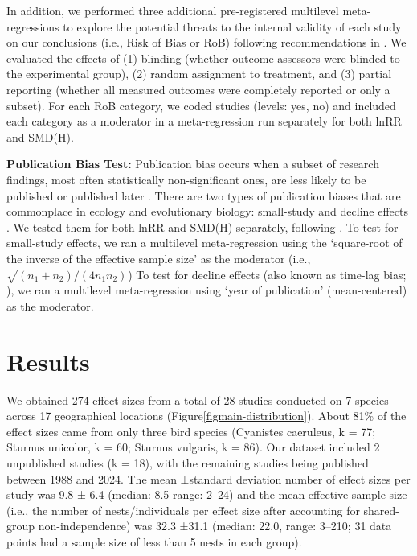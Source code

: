 \documentclass[
  number,
  review,
  onecolumn]{elsarticle}
\begin{document}
In addition, we performed three additional pre-registered multilevel
meta-regressions to explore the potential threats to the internal
validity of each study on our conclusions (i.e., Risk of Bias or RoB)
following recommendations in \citep{culina2025} . We evaluated the
effects of (1) blinding (whether outcome assessors were blinded to the
experimental group), (2) random assignment to treatment, and (3) partial
reporting (whether all measured outcomes were completely reported or
only a subset). For each RoB category, we coded studies (levels: yes,
no) and included each category as a moderator in a meta-regression run
separately for both lnRR and SMD(H).

\textbf{Publication Bias Test:} Publication bias occurs when a subset of
research findings, most often statistically non-significant ones, are
less likely to be published or published later \citep{Jennisons2013}.
There are two types of publication biases that are commonplace in
ecology and evolutionary biology: small-study and decline effects
\citep{yang2023}. We tested them for both lnRR and SMD(H) separately,
following \citep{nakagawa2022a}. To test for small-study effects, we ran
a multilevel meta-regression using the `square-root of the inverse of
the effective sample size' as the moderator (i.e.,
\(\sqrt{(n_1+n_2)/ (4n_1n_2)}\)) To test for decline effects (also known
as time-lag bias; \citep{sanchez-tojar2018}), we ran a multilevel
meta-regression using `year of publication' (mean-centered) as the
moderator.

\section{Results}\label{results}

We obtained 274 effect sizes from a total of 28 studies conducted on 7
species across 17 geographical locations
(Figure\ref{figmain-distribution}). About 81\% of the effect sizes came
from only three bird species (Cyanistes caeruleus, k = 77; Sturnus
unicolor, k = 60; Sturnus vulgaris, k = 86). Our dataset included 2
unpublished studies (k = 18), with the remaining studies being published
between 1988 and 2024. The mean ±standard deviation number of effect
sizes per study was 9.8 ± 6.4 (median: 8.5 range: 2--24) and the mean
effective sample size (i.e., the number of nests/individuals per effect
size after accounting for shared-group non-independence) was 32.3 ±31.1
(median: 22.0, range: 3--210; 31 data points had a sample size of less
than 5 nests in each group).
\end{document}
